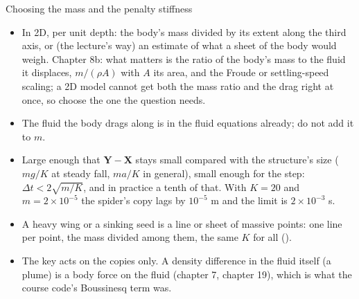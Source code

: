 \documentclass[aspectratio=169,11pt]{beamer}
\begin{document}
\begin{frame}{Choosing the mass and the penalty stiffness}
\label{fr:choosing}
\small
\begin{itemize}
  \item {} In 2D, per unit depth: the body's mass divided by its extent along the third axis, or (the lecture's way) an estimate of what a sheet of the body would weigh. Chapter 8b: what matters is the ratio of the body's mass to the fluid it displaces, $m/(\rho A)$ with $A$ its area, and the Froude or settling-speed scaling; a 2D model cannot get both the mass ratio and the drag right at once, so choose the one the question needs.
  \item {} The fluid the body drags along is in the fluid equations already; do not add it to $m$.
  \item {} Large enough that $\mathbf{Y} - \mathbf{X}$ stays small compared with the structure's size ($m g/K$ at steady fall, $m a/K$ in general), small enough for the step: $\Delta t < 2\sqrt{m/K}$, and in practice a tenth of that. With $K = 20$ and $m = 2\times10^{-5}$ the spider's copy lags by $10^{-5}$ m and the limit is $2\times10^{-3}$ s.
  \item {} A heavy wing or a sinking seed is a line or sheet of massive points: one  line per point, the mass divided among them, the same $K$ for all ().
  \item {} The key acts on the copies only. A density difference in the fluid itself (a plume) is a body force on the fluid (chapter 7, chapter 19), which is what the course code's Boussinesq term was.
\end{itemize}
\end{frame}
\end{document}

